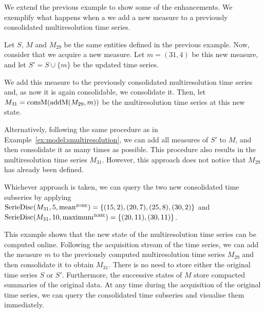 We extend the previous example to show some of the 
enhancements.  We exemplify what happens when a we add a new measure
to a previously consolidated multiresolution time series.
\begin{example}
  Let $S$, $M$ and $M_{29}$ be the same entities defined in the
  previous example.  Now, consider that we acquire a new measure. Let
  $m=(31,4)$ be this new measure, and let $S' = S \cup \{m\}$ be the
  updated time series.

  We add this measure to the previously consolidated multiresolution
  time series and, as now it is again consolidable, we consolidate
  it. Then, let $M_{31} = \operatorname{consM}(\operatorname{addM}(M_{29},m))$ be the
  multiresolution time series at this new state.

  Alternatively, following the same procedure as in
  Example~\ref{ex:model:smultiresolution}, we can add all measures of
  $S'$ to $M$, and then consolidate it as many times as
  possible.  This procedure also results in the multiresolution time
  series $M_{31}$. However, this approach does not notice that
  $M_{29}$ has already been defined.

  Whichever approach is taken, we can query the two new consolidated
  time subseries by applying $\seriedisc(M_{31},5,\allowbreak
  \meanz)=\{\allowbreak (15,\allowbreak 2),\allowbreak
  (20,7),\allowbreak (25,8),\allowbreak(30,2)\}$ and
  $\seriedisc(M_{31},\allowbreak 10,\allowbreak \maxz) =\allowbreak \{
  \allowbreak (20,11),\allowbreak (30,11)\}$.

  This example shows that the new state of the multiresolution time
  series can be computed online. Following the acquisition stream of
  the time series, we can add the measure $m$ to the previously
  computed multiresolution time series $M_{29}$ and then consolidate
  it to obtain $M_{31}$. There is no need to store either the original
  time series $S$ or $S'$. Furthermore, the successive states of $M$
  store compacted summaries of the original data. At any time during
  the acquisition of the original time series, we can query the
  consolidated time subseries and visualise them immediately.
\end{example}





